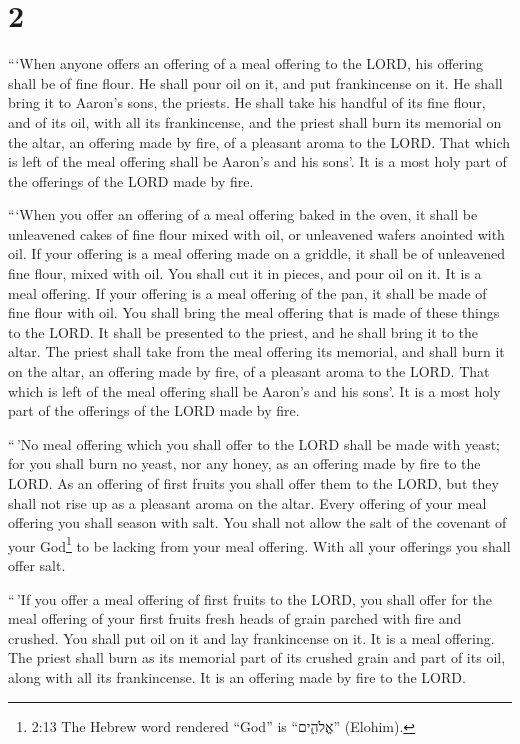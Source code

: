 \hypertarget{section-1}{%
\section{2}\label{section-1}}

 ```When anyone offers an offering of a meal offering to the
LORD, his offering shall be of fine flour. He shall pour oil on it, and
put frankincense on it.  He shall bring it to Aaron's sons,
the priests. He shall take his handful of its fine flour, and of its
oil, with all its frankincense, and the priest shall burn its memorial
on the altar, an offering made by fire, of a pleasant aroma to the LORD.
 That which is left of the meal offering shall be Aaron's
and his sons'. It is a most holy part of the offerings of the LORD made
by fire.

 ```When you offer an offering of a meal offering baked in
the oven, it shall be unleavened cakes of fine flour mixed with oil, or
unleavened wafers anointed with oil.  If your offering is a
meal offering made on a griddle, it shall be of unleavened fine flour,
mixed with oil.  You shall cut it in pieces, and pour oil on
it. It is a meal offering.  If your offering is a meal
offering of the pan, it shall be made of fine flour with oil.
 You shall bring the meal offering that is made of these
things to the LORD. It shall be presented to the priest, and he shall
bring it to the altar.  The priest shall take from the meal
offering its memorial, and shall burn it on the altar, an offering made
by fire, of a pleasant aroma to the LORD.  That which is
left of the meal offering shall be Aaron's and his sons'. It is a most
holy part of the offerings of the LORD made by fire.

 ``\,'No meal offering which you shall offer to the LORD
shall be made with yeast; for you shall burn no yeast, nor any honey, as
an offering made by fire to the LORD.  As an offering of
first fruits you shall offer them to the LORD, but they shall not rise
up as a pleasant aroma on the altar.  Every offering of
your meal offering you shall season with salt. You shall not allow the
salt of the covenant of your God\footnote{2:13 The Hebrew word rendered
  ``God'' is ``אֱלֹהִ֑ים'' (Elohim).} to be lacking from your meal
offering. With all your offerings you shall offer salt.

 ``\,'If you offer a meal offering of first fruits to the
LORD, you shall offer for the meal offering of your first fruits fresh
heads of grain parched with fire and crushed.  You shall
put oil on it and lay frankincense on it. It is a meal offering.
 The priest shall burn as its memorial part of its crushed
grain and part of its oil, along with all its frankincense. It is an
offering made by fire to the LORD.

